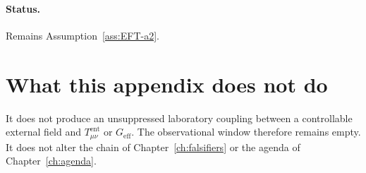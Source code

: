 \paragraph{Status.}
Remains Assumption~\ref{ass:EFT-a2}.

\section{What this appendix does not do}
\label{sec:status-not}

It does not produce an unsuppressed laboratory coupling between a
controllable external field and \(T_{\mu\nu}^{\mathrm{ent}}\) or
\(G_{\mathrm{eff}}\). The observational window therefore remains empty.
It does not alter the chain of Chapter~\ref{ch:falsifiers} or the agenda of
Chapter~\ref{ch:agenda}.
